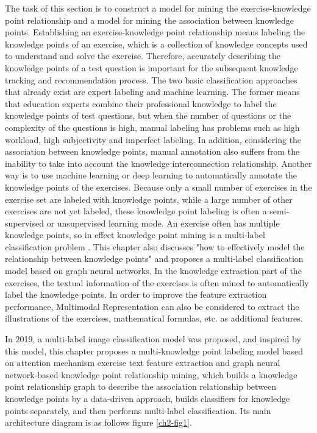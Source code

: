 The task of this section is to construct a model for mining the exercise-knowledge point relationship and a model for mining the association between knowledge points. Establishing an exercise-knowledge point relationship means labeling the knowledge points of an exercise, which is a collection of knowledge concepts used to understand and solve the exercise. Therefore, accurately describing the knowledge points of a test question is important for the subsequent knowledge tracking and recommendation process. The two basic classification approaches that already exist are expert labeling and machine learning. The former means that education experts combine their professional knowledge to label the knowledge points of test questions, but when the number of questions or the complexity of the questions is high, manual labeling has problems such as high workload, high subjectivity and imperfect labeling. In addition, considering the association between knowledge points, manual annotation also suffers from the inability to take into account the knowledge interconnection relationship. Another way is to use machine learning or deep learning to automatically annotate the knowledge points of the exercises. Because only a small number of exercises in the exercise set are labeled with knowledge points, while a large number of other exercises are not yet labeled, these knowledge point labeling is often a semi-supervised or unsupervised learning mode. An exercise often has multiple knowledge points, so in effect knowledge point mining is a multi-label classification problem \cite{tsoumakas2007multi,zhang2013review,liu2020emerging}. This chapter also discusses "how to effectively model the relationship between knowledge points" and proposes a multi-label classification model based on graph neural networks. In the knowledge extraction part of the exercises, the textual information of the exercises is often mined to automatically label the knowledge points. In order to improve the feature extraction performance, Multimodal Representation \cite{guo2019deep} can also be considered to extract the illustrations of the exercises, mathematical formulas, etc. as additional features. 

In 2019, a multi-label image classification model was proposed\cite{chen2019multi}, and inspired by this model, this chapter proposes a multi-knowledge point labeling model based on attention mechanism exercise text feature extraction and graph neural network-based knowledge point relationship mining, which builds a knowledge point relationship graph to describe the association relationship between knowledge points by a data-driven approach, builds classifiers for knowledge points separately, and then performs multi-label classification. Its main architecture diagram is as follows figure \ref{ch2-fig1}.

